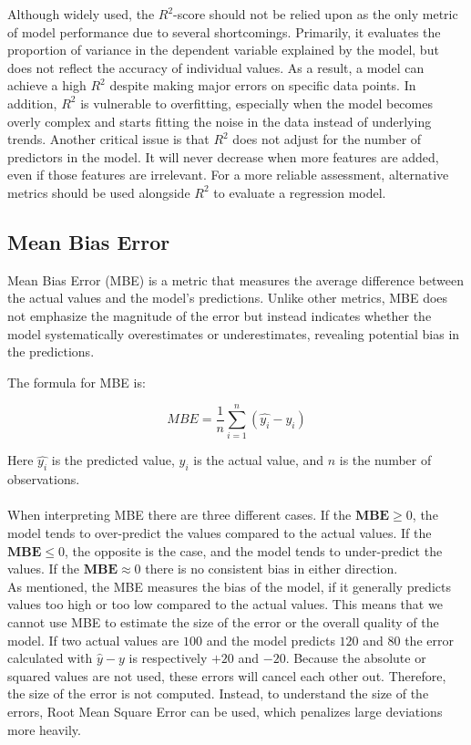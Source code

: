 \noindent Although widely used, the $R^2$-score should not be relied upon as the only metric of model performance due to several shortcomings. Primarily, it evaluates the proportion of variance in the dependent variable explained by the model, but does not reflect the accuracy of individual values. As a result, a model can achieve a high $R^2$ despite making major errors on specific data points. In addition, $R^2$ is vulnerable to overfitting, especially when the model becomes overly complex and starts fitting the noise in the data instead of underlying trends. Another critical issue is that $R^2$ does not adjust for the number of predictors in the model. It will never decrease when more features are added, even if those features are irrelevant. For a more reliable assessment, alternative metrics should be used alongside $R^2$ to evaluate a regression model. 
\newpage

\subsection{Mean Bias Error}
Mean Bias Error (MBE) is a metric that measures the average difference between the actual values and the model's predictions. Unlike other metrics, MBE does not emphasize the magnitude of the error but instead indicates whether the model systematically overestimates or underestimates, revealing potential bias in the predictions.

The formula for MBE is:

$$MBE=\frac{1}{n}\sum_{i=1}^{n}(\hat{y_i}-y_i)$$

\noindent Here $\hat{y_i}$ is the predicted value, $y_i$ is the actual value, and $n$ is the number of observations.
\\\\

When interpreting MBE there are three different cases. If the $\textbf{MBE}\geq 0$, the model tends to over-predict the values compared to the actual values. If the $\textbf{MBE}\leq0$, the opposite is the case, and the model tends to under-predict the values. If the $\textbf{MBE}\approx0$ there is no consistent bias in either direction.
\\

\noindent As mentioned, the MBE measures the bias of the model, if it generally predicts values too high or too low compared to the actual values. This means that we cannot use MBE to estimate the size of the error or the overall quality of the model. If two actual values are $100$ and the model predicts $120$ and $80$ the error calculated with $\hat{y}-y$ is respectively $+20$ and $-20$. Because the absolute or squared values are not used, these errors will cancel each other out. Therefore, the size of the error is not computed. Instead, to understand the size of the errors, Root Mean Square Error can be used, which penalizes large deviations more heavily.

